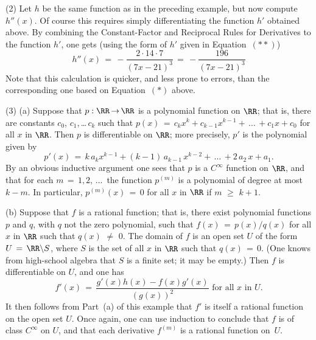 \V

        (2) Let $h$ be the same function as in the preceding example, but now compute $h''(x)$.
    Of course this requires simply differentiating the function $h'$ obtained above.
    By combining the Constant-Factor and Reciprocal Rules for Derivatives to the function $h'$, one gets (using the form of $h'$ given in Equation~$({\ast}{\ast})$)
        \begin{displaymath}
        h''(x) \,=\, - \frac{2{\cdot}14{\cdot}7}{(7x-21)^{3}} \,=\, -\frac{196}{(7x-21)^{3}}
        \end{displaymath}
    Note that this calculation is quicker, and less prone to errors, than the corresponding one based on Equation~$({\ast})$ above.

\V

        (3) (a) Suppose that $p:{\RR} \,{\rightarrow}\, {\RR}$ is a polynomial function on ${\RR}$;
    that is, there are constants $c_{0}$, $c_{1}$,\,{\ldots}\,$c_{k}$ such that $p(x) \,=\, c_{k}x^{k} + c_{k-1}x^{k-1} + \,{\ldots}\,+c_{1}x + c_{0}$ for all $x$ in ${\RR}$.
    Then $p$ is differentiable on ${\RR}$; more precisely, $p'$ is the polynomial given by
        \begin{displaymath}
        p'(x) \,=\, k\,a_{k}x^{k-1} + (k-1)\,a_{k-1}\,x^{k-2} + \,{\ldots}\, +2\,a_{2}\,x + a_{1}.
        \end{displaymath}
    By an obvious inductive argument one sees that $p$ is a $C^{{\infty}}$ function on ${\RR}$,
    and that for each $m \,=\, 1,2,\,{\ldots}\,$ the function $p^{(m)}$ is a polynomial of degree at most $k-m$.
    In particular, $p^{(m)}(x) \,=\, 0$ for all $x$ in ${\RR}$ if $m\,\,{\geq}\,\,k+1$.

\V

        (b) Suppose that $f$ is a rational function; that is, there exist polynomial functions $p$ and $q$, with $q$ not the zero polynomial,
    such that $f(x) \,=\, p(x)/q(x)$ for all $x$ in ${\RR}$ such that $q(x) \,\,{\neq}\,\, 0$.
    The domain of $f$ is an open set $U$ of the form $U \,=\, {\RR}{\setminus}S$,
    where $S$ is the set of all $x$ in ${\RR}$ such that $q(x) \,=\, 0$.
    (One knows from high-school algebra that $S$ is a finite set; it may be empty.)
    Then $f$ is differentiable on $U$, and one has
        \begin{displaymath}
        f'(x) \,=\, \frac{g'(x)h(x) - f(x)g'(x)}{\left(g(x)\right)^{2}} \mbox{ for all $x$ in $U$}.
        \end{displaymath}
    It then follows from Part~(a) of this example that $f'$ is itself a rational function on the open set $U$.
    Once again, one can use induction to conclude that $f$ is of class $C^{{\infty}}$ on $U$, and that each derivative $f^{(m)}$ is a rational function on~$U$.

